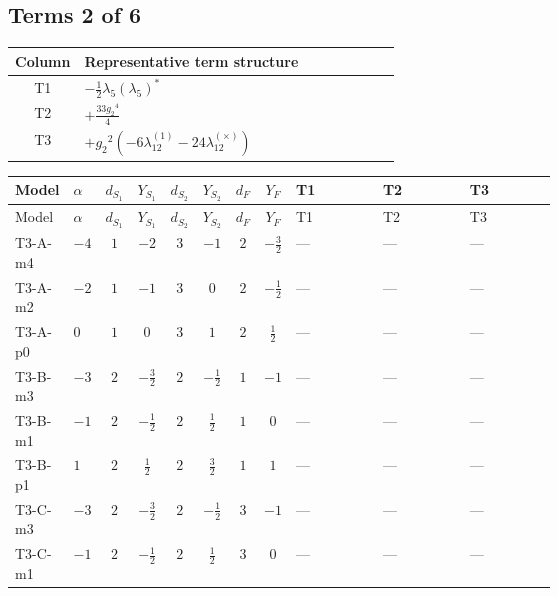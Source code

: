 \documentclass[8pt]{article}
\begin{document}
\begin{landscape}
\subsection*{Terms 2 of 6}
\begin{center}
\begin{tabular}{@{}c >{\raggedright\arraybackslash}p{0.82\linewidth}@{}}
\toprule
Column & Representative term structure \\
\midrule
T1 & \(\displaystyle -\frac{1}{2} {\lambda_5} \left({\lambda_5}\right)^{*}\) \\
\midrule
T2 & \(\displaystyle +\frac{33 {g_2}^4}{4}\) \\
\midrule
T3 & \(\displaystyle +{g_2}^2 (-6 {\lambda_{12}^{(1)}}-24 {\lambda_{12}^{(\times)}})\) \\
\midrule
\bottomrule
\end{tabular}
\end{center}
\smallskip
\tiny
\begin{longtable}{@{}llcccccc >{\raggedright\arraybackslash}p{0.21\linewidth} >{\raggedright\arraybackslash}p{0.21\linewidth} >{\raggedright\arraybackslash}p{0.21\linewidth}@{}}
\toprule
Model & $\alpha$ & $d_{S_1}$ & $Y_{S_1}$ & $d_{S_2}$ & $Y_{S_2}$ & $d_F$ & $Y_F$ & T1 & T2 & T3 \\
\midrule
\endfirsthead
\toprule
Model & $\alpha$ & $d_{S_1}$ & $Y_{S_1}$ & $d_{S_2}$ & $Y_{S_2}$ & $d_F$ & $Y_F$ & T1 & T2 & T3 \\
\midrule
\endhead
T3-A-m4 & $-4$ & $1$ & $-2$ & $3$ & $-1$ & $2$ & $-\frac{3}{2}$ & --- & --- & --- \\
\midrule
T3-A-m2 & $-2$ & $1$ & $-1$ & $3$ & $0$ & $2$ & $-\frac{1}{2}$ & --- & --- & --- \\
\midrule
T3-A-p0 & $0$ & $1$ & $0$ & $3$ & $1$ & $2$ & $\frac{1}{2}$ & --- & --- & --- \\
\midrule
T3-B-m3 & $-3$ & $2$ & $-\frac{3}{2}$ & $2$ & $-\frac{1}{2}$ & $1$ & $-1$ & --- & --- & --- \\
\midrule
T3-B-m1 & $-1$ & $2$ & $-\frac{1}{2}$ & $2$ & $\frac{1}{2}$ & $1$ & $0$ & --- & --- & --- \\
\midrule
T3-B-p1 & $1$ & $2$ & $\frac{1}{2}$ & $2$ & $\frac{3}{2}$ & $1$ & $1$ & --- & --- & --- \\
\midrule
T3-C-m3 & $-3$ & $2$ & $-\frac{3}{2}$ & $2$ & $-\frac{1}{2}$ & $3$ & $-1$ & --- & --- & --- \\
\midrule
T3-C-m1 & $-1$ & $2$ & $-\frac{1}{2}$ & $2$ & $\frac{1}{2}$ & $3$ & $0$ & --- & --- & --- \\

\end{longtable}
\end{landscape}
\end{document}
